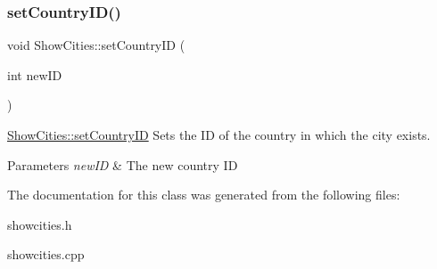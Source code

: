 \subsubsection{\texorpdfstring{set\+Country\+I\+D()}{setCountryID()}}
{\footnotesize\ttfamily void Show\+Cities\+::set\+Country\+ID (\begin{DoxyParamCaption}\item[{int}]{new\+ID }\end{DoxyParamCaption})}



\mbox{\hyperlink{class_show_cities_a853a958ebc2c0d42d872c237d431fe25}{Show\+Cities\+::set\+Country\+ID}} Sets the ID of the country in which the city exists. 


\begin{DoxyParams}{Parameters}
{\em new\+ID} & The new country ID \\
\hline
\end{DoxyParams}


The documentation for this class was generated from the following files\+:\begin{DoxyCompactItemize}
\item 
showcities.\+h\item 
showcities.\+cpp\end{DoxyCompactItemize}
